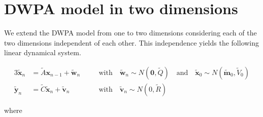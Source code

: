 \documentclass[fleqn,12pt]{article}
\begin{document}
\section{DWPA model in two dimensions}
\label{sec:dwpaModel2D}

We extend the DWPA model from one to two dimensions considering each of the two
dimensions independent of each other. This independence yields the following
linear dynamical system.

\begin{alignat}{3}
    \tilde{\mathbf{x}}_n &= \tilde{A}\mathbf{x}_{n-1} + \tilde{\mathbf{w}}_n && \quad \text{with} \quad\tilde{\mathbf{w}}_n\sim N(\mathbf{0}, \tilde{Q})\quad \text{and} \quad\tilde{\mathbf{x}}_0\sim N(\tilde{\mathbf{m}}_0, \tilde{V}_0)\label{eq:2D_DWPA_state}\\
    \tilde{\mathbf{y}}_n &= \tilde{C}\tilde{\mathbf{x}}_{n} + \tilde{\mathbf{v}}_n && \quad \text{with} \quad \tilde{\mathbf{v}}_n\sim N(0, \tilde{R})\label{eq:2D_DWPA_measurement}
\end{alignat}

\noindent where
\end{document}
